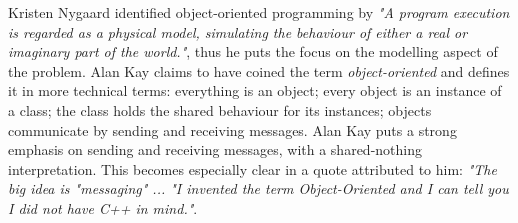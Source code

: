 Kristen Nygaard identified object-oriented programming by \textit{"A program execution is regarded as a physical model, simulating the behaviour of either a real or imaginary part of the world."}, thus he puts the focus on the modelling aspect of the problem. Alan Kay claims to have coined the term \textit{object-oriented} and defines it in more technical terms: everything is an object; every object is an instance of a class; the class holds the shared behaviour for its instances; objects communicate by sending and receiving messages. Alan Kay puts a strong emphasis on sending and receiving messages, with a shared-nothing interpretation. This becomes especially clear in a quote attributed to him: \textit{"The big idea is "messaging" ... "I invented the term Object-Oriented and I can tell you I did not have C++ in mind."}.

\medskip



